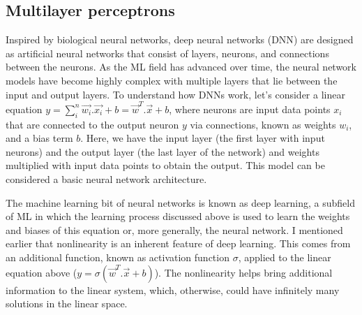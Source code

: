 \subsection{Multilayer perceptrons}

Inspired by biological neural networks, deep neural networks (\gls{DNN}) are designed as artificial neural networks that consist of layers, neurons, and connections between the neurons. As the \gls{ML} field has advanced over time, the neural network models have become highly complex with multiple layers that lie between the input and output layers. To understand how \gls{DNN}s work, let's consider a linear equation $y = \sum^n_i\vec{w_i} . \vec{x_i} + b = \vec{w}^T . \vec{x} + b$, where neurons are input data points $x_i$ that are connected to the output neuron $y$ via connections, known as weights $w_i$, and a bias term $b$. Here, we have the input layer (the first layer with input neurons) and the output layer (the last layer of the network)  and weights multiplied with input data points to obtain the output. This model can be considered a basic neural network architecture. 


The machine learning bit of neural networks is known as deep learning, a subfield of \gls{ML} in which the learning process discussed above is used to learn the weights and biases of this equation or, more generally, the neural network. I mentioned earlier that nonlinearity is an inherent feature of deep learning. This comes from an additional function, known as activation function $\sigma$, applied to the linear equation above ($y = \sigma(\vec{w} ^T. \vec{x} + b)$). The nonlinearity helps bring additional information to the linear system, which, otherwise, could have infinitely many solutions in the linear space.



